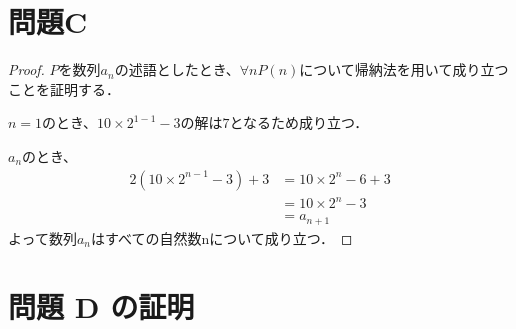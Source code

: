 \documentclass[dvipdfmx]{jlreq}
\begin{document}
	\section{問題C}
		\begin{proof}
			$P$を数列$a_n$の述語としたとき、$\forall n P(n)$について帰納法を用いて成り立つことを証明する．

			$n = 1$のとき、$10 \times 2 ^ {1 - 1} -3$の解は$7$となるため成り立つ．

			$a_n$のとき、
			\begin{equation}
			\begin{split}
				2(10 \times 2 ^ {n - 1} -3) + 3 &= 10 \times 2 ^ n - 6 + 3 \\
				&= 10 \times 2 ^ n - 3 \\
				&= a_{n+1}
			\end{split}
			\end{equation}
			よって数列$a_n$はすべての自然数nについて成り立つ．
		\end{proof}

		\section*{問題 D の証明}
\end{document}
